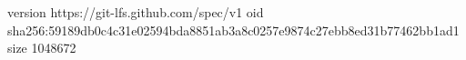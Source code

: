 version https://git-lfs.github.com/spec/v1
oid sha256:59189db0c4c31e02594bda8851ab3a8c0257e9874c27ebb8ed31b77462bb1ad1
size 1048672
